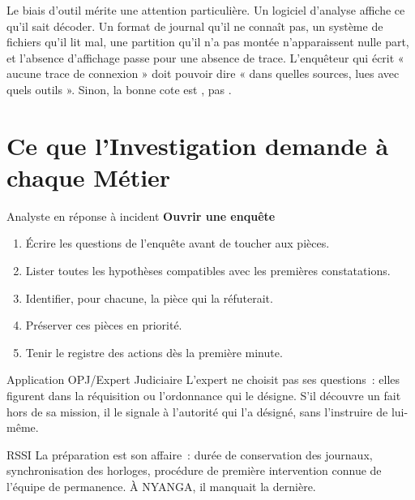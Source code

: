 Le biais d'outil mérite une attention particulière. Un logiciel d'analyse
affiche ce qu'il sait décoder. Un format de journal qu'il ne connaît pas, un
système de fichiers qu'il lit mal, une partition qu'il n'a pas montée
n'apparaissent nulle part, et l'absence d'affichage passe pour une absence de
trace. L'enquêteur qui écrit « aucune trace de connexion » doit pouvoir dire
« dans quelles sources, lues avec quels outils ». Sinon, la bonne cote est
\NEK{}, pas \NON{}.

\section{Ce que l'Investigation demande à chaque Métier}
\label{sec:c01-metiers}

\begin{boxmetier}{Analyste en réponse à incident}
\textbf{Ouvrir une enquête}
\begin{enumerate}
    \item Écrire les questions de l'enquête avant de toucher aux pièces.
    \item Lister toutes les hypothèses compatibles avec les premières
          constatations.
    \item Identifier, pour chacune, la pièce qui la réfuterait.
    \item Préserver ces pièces en priorité.
    \item Tenir le registre des actions dès la première minute.
\end{enumerate}
\end{boxmetier}

\begin{boxmetier}{Application OPJ/Expert Judiciaire}
L'expert ne choisit pas ses questions~: elles figurent dans la réquisition
ou l'ordonnance qui le désigne. S'il découvre un fait hors de sa mission, il
le signale à l'autorité qui l'a désigné, sans l'instruire de lui-même.
\end{boxmetier}

\begin{boxmetier}{RSSI}
La préparation est son affaire~: durée de conservation des journaux,
synchronisation des horloges, procédure de première intervention connue de
l'équipe de permanence. À NYANGA, il manquait la dernière.
\end{boxmetier}

\separateur

